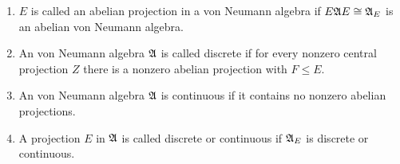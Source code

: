 \begin{defn}
	\begin{enumerate}[label=\arabic*)]
		\item $E$ is called an abelian projection in a von Neumann algebra if $E\mathfrak{A} E \cong \mathfrak{A}_E$ is an abelian von Neumann algebra.
		\item An von Neumann algebra $\mathfrak{A}$ is called discrete if for every nonzero central projection $Z$ there is a nonzero abelian projection with $F \leqslant E$.
		\item An von Neumann algebra $\mathfrak{A}$ is continuous if it contains no nonzero abelian projections.
		\item A projection $E$ in $\mathfrak{A}$ is called discrete or continuous if $\mathfrak{A}_E$ is discrete or continuous.
	\end{enumerate}
\end{defn}

